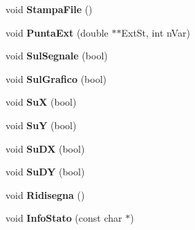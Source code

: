 \begin{DoxyCompactItemize}
\item 
\hypertarget{classElementiGrafici_a73e375f008c0d0ea1dafc4f215f217e0}{void {\bfseries \-Stampa\-File} ()}\label{classElementiGrafici_a73e375f008c0d0ea1dafc4f215f217e0}

\item 
\hypertarget{classElementiGrafici_a6dfbf3d00f9a30e895519026e5a524fc}{void {\bfseries \-Punta\-Ext} (double $\ast$$\ast$\-Ext\-St, int n\-Var)}\label{classElementiGrafici_a6dfbf3d00f9a30e895519026e5a524fc}

\item 
\hypertarget{classElementiGrafici_aab89c647fd8087701ae2bd5649ac0e71}{void {\bfseries \-Sul\-Segnale} (bool)}\label{classElementiGrafici_aab89c647fd8087701ae2bd5649ac0e71}

\item 
\hypertarget{classElementiGrafici_ad28434da4f00671fa2bb44b21d650793}{void {\bfseries \-Sul\-Grafico} (bool)}\label{classElementiGrafici_ad28434da4f00671fa2bb44b21d650793}

\item 
\hypertarget{classElementiGrafici_a576e02963c06c6bf4093be751a05864a}{void {\bfseries \-Su\-X} (bool)}\label{classElementiGrafici_a576e02963c06c6bf4093be751a05864a}

\item 
\hypertarget{classElementiGrafici_abb76b56883789f3b2996fca37d4e5627}{void {\bfseries \-Su\-Y} (bool)}\label{classElementiGrafici_abb76b56883789f3b2996fca37d4e5627}

\item 
\hypertarget{classElementiGrafici_a7d191cc9235876312b5ffa331687f618}{void {\bfseries \-Su\-D\-X} (bool)}\label{classElementiGrafici_a7d191cc9235876312b5ffa331687f618}

\item 
\hypertarget{classElementiGrafici_abfb6855da4602206465bcfa5f9d7edc6}{void {\bfseries \-Su\-D\-Y} (bool)}\label{classElementiGrafici_abfb6855da4602206465bcfa5f9d7edc6}

\item 
\hypertarget{classElementiGrafici_a16a08184aeafd1fee3a1ff7cda78ae9f}{void {\bfseries \-Ridisegna} ()}\label{classElementiGrafici_a16a08184aeafd1fee3a1ff7cda78ae9f}

\item 
\hypertarget{classElementiGrafici_af18e5840aacd449087ad7fd565376671}{void {\bfseries \-Info\-Stato} (const char $\ast$)}\label{classElementiGrafici_af18e5840aacd449087ad7fd565376671}


\end{DoxyCompactItemize}
